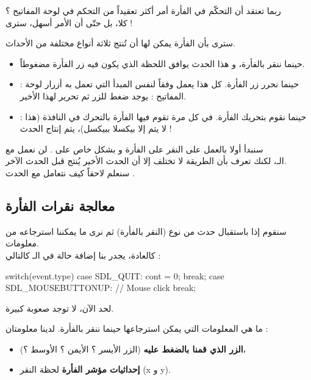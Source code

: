 ربما تعتقد أن التحكّم في الفأرة أمر أكثر تعقيداً من التحكم في لوحة المفاتيح ؟\\
كلا، بل حتّى أن الأمر أسهل، سترى !

سترى بأن الفأرة يمكن لها أن تُنتج ثلاثة أنواع مختلفة من الأحداث.

\begin{itemize}
	\item {}
	حينما ننقر بالفأرة، و هذا الحدث يوافق اللحظة الذي يكون فيه زر الفأرة مضغوطاً.
	\item {} :
	حينما نحرر زر الفأرة. كل هذا يعمل وفقاً لنفس المبدأ التي تعمل به أزرار لوحة المفاتيح : يوجد ضغط للزر ثم تحرير لهذا الأخير.
	\item {} :
	حينما نقوم بتحريك الفأرة. في كل مرة تقوم فيها الفأرة بالتحرك في النافذة (هذا لا يتم إلا بيكسلا ببيكسل)، يتم إنتاج الحدث 
	 !
\end{itemize}
 
سنبدأ أولا بالعمل على النقر على الفأرة و بشكل خاص على
.
لن نعمل مع\\
الـ،
لكنك تعرف بأن الطريقة لا تختلف إلا أن الحدث الأخير يُنتج قبل الحدث الآخر.\\
سنعلم لاحقاً كيف نتعامل مع الحدث
.

\subsection{معالجة نقرات الفأرة}

سنقوم إذا باستقبال حدث من نوع
(النقر بالفأرة) ثم نرى ما يمكننا استرجاعه من معلومات.\\
كالعادة، يجدر بنا إضافة حالة
في الـ
كالتالي :

\begin{Csource}
switch(event.type)
{
	case SDL_QUIT:
	cont = 0;
	break;
	case SDL_MOUSEBUTTONUP: // Mouse click
	break;
} 
\end{Csource}

لحد الآن، لا توجد صعوبة كبيرة.

ما هي المعلومات التي يمكن استرجاعها حينما ننقر بالفأرة. لدينا معلومتان :

\begin{itemize}
	\item \textbf{الزر الذي قمنا بالضغط عليه}
	 (الزر الأيسر ؟ الأيمن ؟ الأوسط ؟)،
	\item \textbf{إحداثيات مؤشر الفأرة}
	 لحظة النقر 
	(\textenglish{x}
	و
	\textenglish{y}).
\end{itemize}

